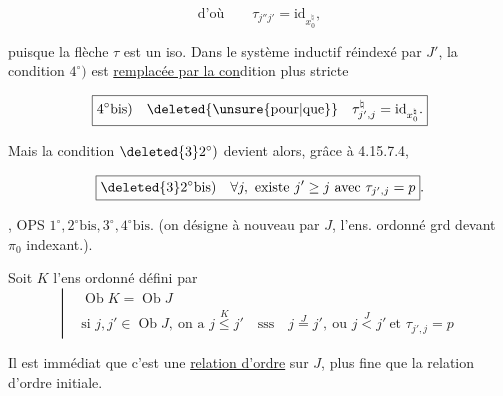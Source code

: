 \[\text{d'où}\qquad\tau_{j''j'}=\mathrm{id}_{x_0^\natural},\]

puisque la flèche $\tau$  est un iso. Dans  le système inductif réindexé par $J'$,  la condition $4^\circ)$ est \uline{remplacée par la con}dition plus stricte

\[\boxed{4^\circ\text{bis})\quad\deleted{\text{\unsure{pour|que}}}\quad\tau_{j',j}^\natural=\mathrm{id}_{x_0^\natural}.}\]

Mais la condition $\deleted{3}2^\circ)$ devient alors, grâce à 4.15.7.4,

\[\boxed{\deleted{3}2^\circ\text{bis})\quad\forall j,\ \text{existe }j'\geq j\ \text{avec }\tau_{j',j}=p}. \]

, OPS $1^\circ,2^\circ\mathrm{bis},3^\circ,4^\circ\mathrm{bis}$. (on désigne à nouveau par $J$,  l'ens. ordonné grd devant $\pi_0$ indexant.).


Soit $K$ l'ens ordonné défini par
%
%
\[\left|\begin{aligned}&\operatorname{Ob}K=\operatorname{Ob}J\\ &\text{si }j,j'\in\operatorname{Ob}J,\ \text{on a } j\overset{K}{\leq}j'\quad\text{sss}\quad j\overset{J}{=}j',\ \text{ou }j\overset{J}{<}j'\ \text{et }\tau_{j',j}=p\end{aligned}\right.\]

Il est immédiat que c'est une \uline{relation d'ordre} sur $J$, plus fine que la relation d'ordre initiale.






